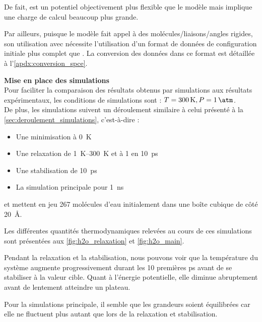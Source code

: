 De fait, \reaxff{} est un potentiel objectivement plus flexible que le modèle \spce{} mais implique une charge de calcul beaucoup plus grande.

Par ailleurs, puisque le modèle \spce{} fait appel à des molécules/liaisons/angles rigides, son utilisation avec \lammps{} nécessite l'utilisation d'un format de données de configuration initiale plus complet que \reaxff{}. La conversion des données dans ce format est détaillée à l'\autoref{apdx:conversion_spce}.

\textbf{Mise en place des simulations}\\
Pour faciliter la comparaison des résultats obtenus par simulations aux résultats expérimentaux, les conditions de simulations sont : $T = \qty{300}{\kelvin}, P = \qty{1}{\atm}$.\\
De plus, les simulations suivent un déroulement similaire à celui présenté à la \autoref{sec:deroulement_simulations}, c'est-à-dire :
\begin{itemize}
    \item Une minimisation à \qty{0}{\kelvin}
    \item Une relaxation de \qtyrange{1}{300}{\kelvin} et à \qty{1}{\atm} en \qty{10}{\pico \second}
    \item Une stabilisation de \qty{10}{\pico \second}
    \item La simulation principale pour \qty{1}{\nano \second}
\end{itemize}
et mettent en jeu \num{267} molécules d'eau initialement dans une boîte cubique de côté \qty{20}{\angstrom}.

Les différentes quantités thermodynamiques relevées au cours de ces simulations sont présentées aux \autoref{fig:h2o_relaxation} et \ref{fig:h2o_main}.

Pendant la relaxation et la stabilisation, nous pouvons voir que la température du système augmente progressivement durant les \num{10} premières \unit{\pico \second} avant de se stabiliser à la valeur cible. Quant à l'énergie potentielle, elle diminue abruptement avant de lentement atteindre un plateau.

Pour la simulations principale, il semble que les grandeurs soient équilibrées car elle ne fluctuent plus autant que lors de la relaxation et stabilisation.

